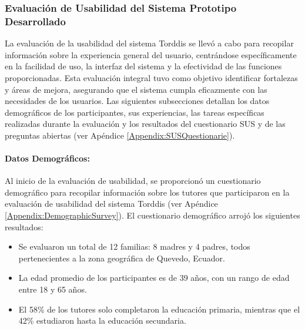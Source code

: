 \documentclass[a4paper,fleqn]{cas-sc}
\begin{document}
				\subsubsection*{Evaluación de Usabilidad del Sistema Prototipo Desarrollado}
				La evaluación de la usabilidad del sistema Torddis se llevó a cabo para recopilar información sobre la experiencia general del usuario, centrándose específicamente en la facilidad de uso, la interfaz del sistema y la efectividad de las funciones proporcionadas. Esta evaluación integral tuvo como objetivo identificar fortalezas y áreas de mejora, asegurando que el sistema cumpla eficazmente con las necesidades de los usuarios. Las siguientes subsecciones detallan los datos demográficos de los participantes, sus experiencias, las tareas específicas realizadas durante la evaluación y los resultados del cuestionario SUS y de las preguntas abiertas (ver Apéndice \ref{Appendix:SUSQuestionarie}).
				
				\paragraph{\textbf{Datos Demográficos:}}
				Al inicio de la evaluación de usabilidad, se proporcionó un cuestionario demográfico para recopilar información sobre los tutores que participaron en la evaluación de usabilidad del sistema Torddis (ver Apéndice \ref{Appendix:DemographicSurvey}). El cuestionario demográfico arrojó los siguientes resultados:
				
				\begin{itemize}
					\item Se evaluaron un total de 12 familias: 8 madres y 4 padres, todos pertenecientes a la zona geográfica de Quevedo, Ecuador.
					\item La edad promedio de los participantes es de 39 años, con un rango de edad entre 18 y 65 años.
					\item El 58\% de los tutores solo completaron la educación primaria, mientras que el 42\% estudiaron hasta la educación secundaria.
				\end{itemize}
				
\end{document}

